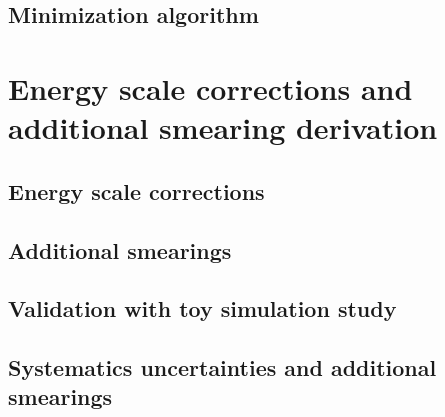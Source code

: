 \subsection{Minimization algorithm}
\section{Energy scale corrections and additional smearing derivation}
\subsection{Energy scale corrections}
\subsection{Additional smearings}
\subsection{Validation with toy simulation study}
\subsection{Systematics uncertainties and additional smearings}
